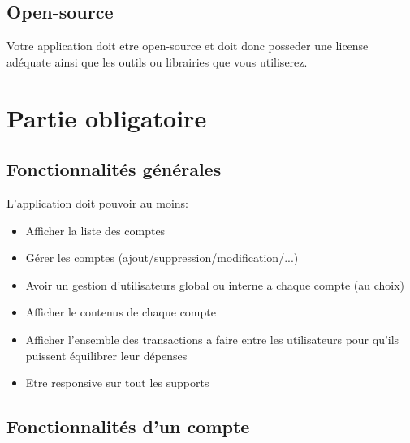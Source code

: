 \documentclass{42-fr}
\begin{document}

	\section{Open-source}
		Votre application doit etre open-source et doit donc posseder une license ad\'equate
		ainsi que les outils ou librairies que vous utiliserez.



\chapter{Partie obligatoire}


    \section{Fonctionnalit\'es g\'en\'erales}

        L'application doit pouvoir au moins:\\

        \begin{itemize}\itemsep1pt
            \item Afficher la liste des comptes
			\item G\'erer les comptes (ajout/suppression/modification/...)
            \item Avoir un gestion d'utilisateurs global ou interne a chaque compte (au choix)
			\item Afficher le contenus de chaque compte
			\item Afficher l'ensemble des transactions a faire entre les
				utilisateurs pour qu'ils puissent \'equilibrer leur d\'epenses
			\item Etre responsive sur tout les supports
        \end{itemize}


    \section{Fonctionnalit\'es d'un compte}
\end{document}
